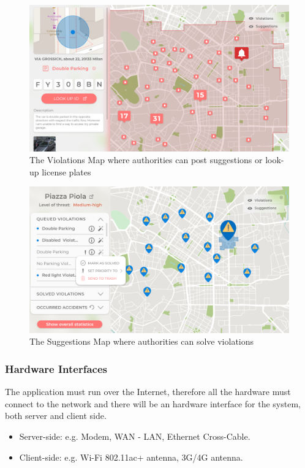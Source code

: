 \documentclass[12pt,a4paper]{article}
\begin{document}
					\begin{figure}[H]
						\centering
						\includegraphics[width=1.0\linewidth]{assets/images/exports/authority/reports-list.png}
						\caption{The Violations Map where authorities can post suggestions or look-up license plates}
						\label{}
					\end{figure}
 					\begin{figure}[H]
						\centering
						\includegraphics[width=1.0\linewidth]{assets/images/exports/authority/suggestions-list.png}
						\caption{The Suggestions Map where authorities can solve violations}
						\label{}
					\end{figure}
		\newpage
\subsubsection{Hardware Interfaces}
The application must run over the Internet, therefore all the hardware must connect to the network and there will be an hardware interface for the system, both server and client side.
		\begin{itemize}
			\item Server-side: e.g. Modem, WAN - LAN, Ethernet Cross-Cable.
			\item Client-side: e.g. Wi-Fi 802.11ac+ antenna, 3G/4G antenna.
		\end{itemize}
\end{document}
